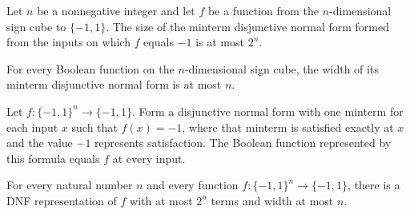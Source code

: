 \begin{theorem}
\label{FABL.size_mintermDNF_le}
\leanok
{}
Let $n$ be a nonnegative integer and let $f$ be a function from the $n$-dimensional sign
cube to $\{ -1,1\}$. The size of the minterm disjunctive normal form formed from the
inputs on which $f$ equals $-1$ is at most $2^n$.
\end{theorem}

\begin{theorem}
\label{FABL.width_mintermDNF_le}
\leanok
{}
For every Boolean function on the $n$-dimensional sign cube, the width of its minterm
disjunctive normal form is at most $n$.
\end{theorem}

\begin{theorem}
\label{FABL.mintermDNF_toBooleanFunction}
\leanok
{}
Let $f:\{-1,1\}^n\to\{-1,1\}$. Form a disjunctive normal form with one minterm for each
input $x$ such that $f(x)=-1$, where that minterm is satisfied exactly at $x$ and the
value $-1$ represents satisfaction. The Boolean function represented by this formula
equals $f$ at every input.
\end{theorem}

\begin{theorem}
\label{FABL.exists_DNFFormula_size_width_bound}
\leanok
{}
For every natural number $n$ and every function $f:\{−1,1\}^n\to\{−1,1\}$, there is a
DNF representation of $f$ with at most $2^n$ terms and width at most $n$.
\end{theorem}

